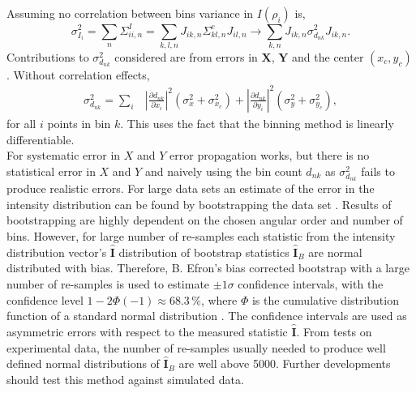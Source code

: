 \documentclass[12pt]{article}
\begin{document}
Assuming no correlation between bins variance in $I(\rho_i)$ is,
\begin{equation*}
    \sigma_{I_{i}}^2=\sum_{n}\Sigma_{ii,n}^I=\sum_{k,l,n}J_{ik,n}\Sigma^c_{kl,n}J_{il,n}\rightarrow \sum_{k,n}J_{ik,n}\sigma_{d_{nk}}^2J_{ik,n}.
\end{equation*}
Contributions to $\sigma^2_{d_{nk}}$ considered are from errors in $\bm{X}$, $\bm{Y}$ and the center $(x_c,y_c)$. Without correlation effects,
\begin{align*}
    \sigma^2_{d_{nk}}=\sum_{i} & \left|\frac{\partial d_{nk}}{\partial x_i}\right|^2(\sigma_x^2+\sigma_{x_c}^2)+\left|\frac{\partial d_{nk}}{\partial y_i}\right|^2(\sigma_y^2+\sigma_{y_c}^2),
\end{align*}
for all $i$ points in bin $k$. This uses the fact that the binning method is linearly differentiable. \\
For systematic error in $X$ and $Y$ error propagation works, but there is no statistical error in $X$ and $Y$ and naively using the bin count $d_{nk}$ as $\sigma^2_{d_{nk}}$ fails to produce realistic errors. For large data sets an estimate of the error in the intensity distribution can be found by bootstrapping the data set \cite{efron_bootstrap_1985,efron_nonparametric_1981}. Results of bootstrapping are highly dependent on the chosen angular order and number of bins. However, for large number of re-samples each statistic from the intensity distribution vector's $\hat{\bm{I}}$ distribution of bootstrap statistics $\hat{\bm{I}}_B$ are normal distributed with bias. Therefore, B. Efron's bias corrected bootstrap with a large number of re-samples is used to estimate $\pm1\sigma$ confidence intervals, with the confidence level $1-2\Phi(-1)\approx68.3\,\%$, where $\Phi$ is the cumulative distribution function of a standard normal distribution \cite{efron_better_1987,efron_transformation_1982,efron_bootstrap_1985}. The confidence intervals are used as asymmetric errors with respect to the measured statistic $\hat{\bm{I}}$. From tests on experimental data, the number of re-samples usually needed to produce well defined normal distributions of $\hat{\bm{I}}_B$ are well above 5000. Further developments should test this method against simulated data.
\end{document}
